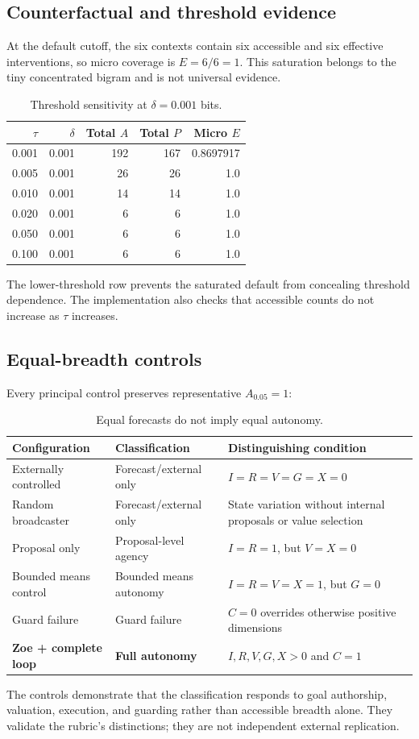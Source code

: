 \documentclass[11pt,a4paper]{article}
\begin{document}
\subsection{Counterfactual and threshold evidence}
At the default cutoff, the six contexts contain six accessible and six effective interventions, so micro coverage is $E=6/6=1$. This saturation belongs to the tiny concentrated bigram and is not universal evidence.
\begin{table}[htbp]
\centering
\caption{Threshold sensitivity at $\delta=0.001$ bits.}
\label{tab:sweep}
\begin{tabular}{rrrrr}
\toprule
$\tau$&$\delta$&Total $A$&Total $P$&Micro $E$\\
\midrule
0.001&0.001&192&167&0.8697917\\
0.005&0.001&26&26&1.0\\
0.010&0.001&14&14&1.0\\
0.020&0.001&6&6&1.0\\
0.050&0.001&6&6&1.0\\
0.100&0.001&6&6&1.0\\
\bottomrule
\end{tabular}
\end{table}
The lower-threshold row prevents the saturated default from concealing threshold dependence. The implementation also checks that accessible counts do not increase as $\tau$ increases.

\subsection{Equal-breadth controls}
Every principal control preserves representative $A_{0.05}=1$:
\begin{table}[htbp]
\centering
\caption{Equal forecasts do not imply equal autonomy.}
\label{tab:controls}
{\small
\begin{tabularx}{\textwidth}{p{3.4cm}p{3.8cm}X}
\toprule
Configuration&Classification&Distinguishing condition\\
\midrule
Externally controlled&Forecast/external only&$I=R=V=G=X=0$\\
Random broadcaster&Forecast/external only&State variation without internal proposals or value selection\\
Proposal only&Proposal-level agency&$I=R=1$, but $V=X=0$\\
Bounded means control&Bounded means autonomy&$I=R=V=X=1$, but $G=0$\\
Guard failure&Guard failure&$C=0$ overrides otherwise positive dimensions\\
\textbf{Zoe + complete loop}&\textbf{Full autonomy}&$I,R,V,G,X>0$ and $C=1$\\
\bottomrule
\end{tabularx}}
\end{table}
The controls demonstrate that the classification responds to goal authorship, valuation, execution, and guarding rather than accessible breadth alone. They validate the rubric's distinctions; they are not independent external replication.
\end{document}
